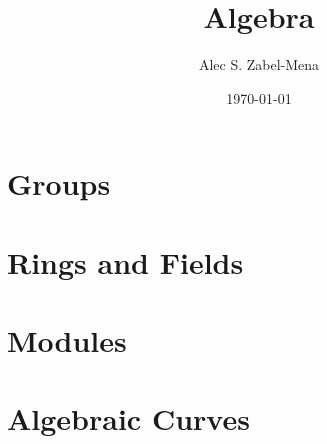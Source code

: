 \documentclass[12pt, twoside]{book}
\title{Algebra}
\author{Alec S. Zabel-Mena}
\date{\today}
\begin{document}
\maketitle
\tableofcontents
\newpage

\part{Groups}






\part{Rings and Fields}








%

\part{Modules}




\part{Algebraic Curves}





%

\nocite{*}



\end{document}
